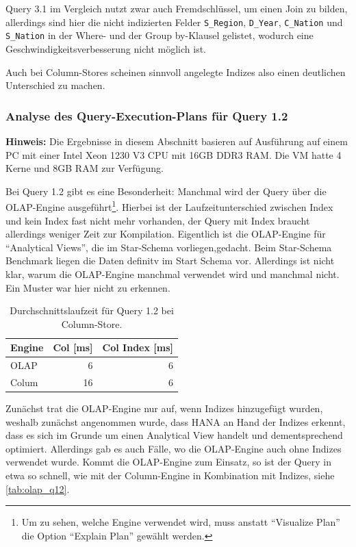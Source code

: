 Query 3.1 im Vergleich nutzt zwar auch Fremdschlüssel, um einen Join zu bilden,
allerdings sind hier die nicht indizierten Felder \verb+S_Region+, \verb+D_Year+,
\verb+C_Nation+ und \verb+S_Nation+ in der Where- und der Group by-Klausel gelistet,
wodurch eine Geschwindigkeitsverbesserung nicht möglich ist.

Auch bei Column-Stores scheinen sinnvoll angelegte Indizes also einen deutlichen Unterschied zu machen.

\subsubsection{Analyse des Query-Execution-Plans für Query 1.2}
\textbf{Hinweis:} Die Ergebnisse in diesem Abschnitt basieren auf Ausführung auf einem PC mit einer Intel Xeon 1230 V3 CPU mit 16GB DDR3 RAM. Die VM hatte 4 Kerne und 8GB RAM zur Verfügung.


Bei Query 1.2 gibt es eine Besonderheit: Manchmal wird der Query über die OLAP-Engine ausgeführt\footnote{Um zu sehen, welche Engine verwendet wird, muss anstatt \enquote{Visualize Plan} die Option \enquote{Explain Plan} gewählt werden.}. 
Hierbei ist der Laufzeitunterschied zwischen Index und kein Index fast nicht mehr vorhanden, der Query mit Index braucht allerdings weniger Zeit zur Kompilation. 
Eigentlich ist die OLAP-Engine für \enquote{Analytical Views}, die im Star-Schema vorliegen,gedacht. Beim Star-Schema Benchmark liegen die Daten definitv im Start Schema vor.
Allerdings ist nicht klar, warum die OLAP-Engine manchmal verwendet wird und manchmal nicht. Ein Muster war hier nicht zu erkennen. 


\begin{table}
    \centering
    \begin{tabular}{lrr}
        \toprule
        Engine              & Col [ms]       & Col Index [ms]    \\
        \toprule
        OLAP                & 6           & 6         \\
        Colum               & 16          & 6         \\   
        \bottomrule
    \end{tabular}
	\caption{Durchschnittslaufzeit für Query 1.2 bei Column-Store.}
    \label{tab:olap_q12}
\end{table}


Zunächst trat die OLAP-Engine nur auf, wenn Indizes hinzugefügt wurden, weshalb zunächst angenommen wurde, dass HANA an Hand der Indizes erkennt, dass es sich im Grunde um einen Analytical View handelt und dementsprechend optimiert.
Allerdings gab es auch Fälle, wo die OLAP-Engine auch ohne Indizes verwendet wurde. Kommt die OLAP-Engine zum Einsatz, so ist der Query in etwa so schnell, wie mit der Column-Engine in Kombination mit Indizes, siehe \autoref{tab:olap_q12}.

